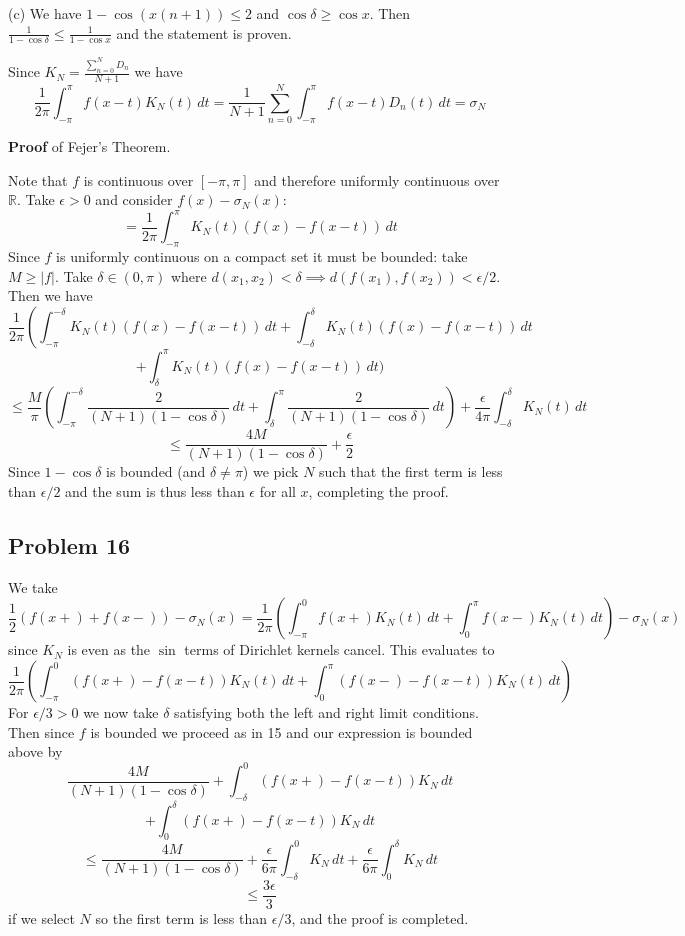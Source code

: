 \documentclass{amsart}
\begin{document}
\medskip \noindent (c) We have $1-\cos(x(n+1))\leq 2$ and $\cos\delta\geq\cos x$. Then $\frac{1}{1-\cos\delta}\leq\frac{1}{1-\cos x}$ and the statement is proven.

\medskip \noindent Since $K_N=\frac{\sum_{n=0}^ND_n}{N+1}$ we have \[\frac{1}{2\pi}\int_{-\pi}^\pi f(x-t)K_N(t)\, dt=\frac{1}{N+1}\sum_{n=0}^N\int_{-\pi}^\pi f(x-t)D_n(t)\,dt = \sigma_N\]

\medskip \noindent \textbf{Proof} of Fejer's Theorem.

\medskip \noindent Note that $f$ is continuous over $[-\pi, \pi]$ and therefore uniformly continuous over $\mathbb{R}$. Take $\epsilon>0$ and consider $f(x)-\sigma_N(x)$:
\[=\frac{1}{2\pi}\int_{-\pi}^\pi K_N(t)(f(x)-f(x-t))\,dt\]
Since $f$ is uniformly continuous on a compact set it must be bounded: take $M\geq |f|$. Take $\delta\in (0,\pi)$ where $d(x_1, x_2)<\delta\implies d(f(x_1),f(x_2))<\epsilon/2$. Then we have
\[\frac{1}{2\pi}\left(\int_{-\pi}^{-\delta} K_N(t)(f(x)-f(x-t))\,dt + \int_{-\delta}^\delta K_N(t)(f(x)-f(x-t))\,dt\]\[+\int_\delta^\pi K_N(t)(f(x)-f(x-t))\,dt\Bigg)\]
\[\leq \frac{M}{\pi}\left(\int_{-\pi}^{-\delta}\frac{2}{(N+1)(1-\cos\delta)}\,dt+\int_{\delta}^{\pi}\frac{2}{(N+1)(1-\cos\delta)}\,dt\right)+\frac{\epsilon}{4\pi}\int_{-\delta}^\delta K_N(t)\,dt\]
\[\leq \frac{4M}{(N+1)(1-\cos\delta)}+\frac{\epsilon}{2}\]
Since $1-\cos\delta$ is bounded (and $\delta\neq \pi$) we pick $N$ such that the first term is less than $\epsilon/2$ and the sum is thus less than $\epsilon$ for all $x$, completing the proof.
	



\subsection*{Problem 16}
We take \[\frac{1}{2}(f(x+)+f(x-))-\sigma_N(x)=\frac{1}{2\pi}\left(\int_{-\pi}^0f(x+)K_N(t)\,dt+\int_0^\pi f(x-)K_N(t)\,dt\right)-\sigma_N(x)\]
since $K_N$ is even as the $\sin$ terms of Dirichlet kernels cancel. This evaluates to 
\[ \frac{1}{2\pi}\left(\int_{-\pi}^0(f(x+)-f(x-t))K_N(t)\,dt+\int_0^\pi(f(x-)-f(x-t))K_N(t)\,dt\right)\]
For $\epsilon/3>0$ we now take $\delta$ satisfying both the left and right limit conditions.
Then since $f$ is bounded we proceed as in 15 and our expression is bounded above by \[\frac{4M}{(N+1)(1-\cos\delta)}+\int_{-\delta}^0(f(x+)-f(x-t))K_N\,dt\]\[+\int_0^\delta(f(x+)-f(x-t))K_N\,dt\]
\[\leq \frac{4M}{(N+1)(1-\cos\delta)}+\frac{\epsilon}{6\pi}\int_{-\delta}^0K_N\,dt+\frac{\epsilon}{6\pi}\int_0^\delta K_N\,dt\]
\[\leq\frac{3\epsilon}{3}\] if we select $N$ so the first term is less than $\epsilon/3$, and the proof is completed.
\end{document}
